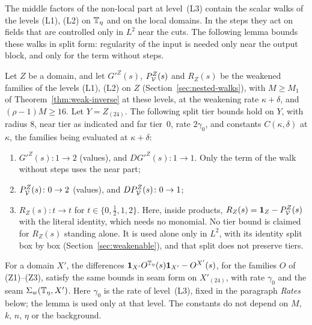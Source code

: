 The middle factors of the non-local part at level~(L3) contain the scalar walks of the levels (L1), (L2) on $\mathbb T_\eta$ and on the local domains. In the steps they act on fields that are controlled only in $L^2$ near the cuts. The following lemma bounds these walks in split form: regularity of the input is needed only near the output block, and only for the term without steps.

\begin{lemma}\label{lem:lift}
Let $Z$ be a domain, and let $G'^Z(s)$, $P^Z_\mathcal V(s)$ and $R_Z(s)$ be the weakened families of the levels (L1), (L2) on $Z$ (Section~\ref{sec:nested-walks}), with $M\ge M_1$ of Theorem~\ref{thm:weak-inverse} at these levels, at the weakening rate $\kappa+\delta$, and $(\rho-1)M\ge16$. Let $Y=Z_{(24)}$. The following split tier bounds hold on $Y$, with radius $8$, near tier as indicated and far tier~$0$, rate $2\gamma_0$, and constants $C(\kappa,\delta)$ at $\kappa$, the families being evaluated at $\kappa+\delta$:
\begin{enumerate}[label=(Z\arabic*)]
\item $G'^Z(s)\colon1\to2$ (values), and $DG'^Z(s)\colon1\to1$. Only the term of the walk without steps uses the near part;
\item $P^Z_\mathcal V(s)\colon0\to2$ (values), and $DP^Z_\mathcal V(s)\colon0\to1$;
\item $R_Z(s)\colon t\to t$ for $t\in\{0,\frac12,1,2\}$. Here, inside products, $R_Z(s)=\mathbf 1_Z-P^Z_\mathcal V(s)$ with the literal identity, which needs no monomial. No tier bound is claimed for $R_Z(s)$ standing alone. It is used alone only in $L^2$, with its identity split box by box (Section~\ref{sec:weakenable}), and that split does not preserve tiers.
\end{enumerate}
For a domain $X'$, the differences $\mathbf 1_{X'}O^{\mathbb T_\eta}(s)\mathbf 1_{X'}-O^{X'}(s)$, for the families $O$ of (Z1)--(Z3), satisfy the same bounds in seam form on $X'_{(24)}$, with rate $\gamma_0$ and the seam $\Sigma_w(\mathbb T_\eta,X')$. Here $\gamma_0$ is the rate of level~(L3), fixed in the paragraph \emph{Rates} below; the lemma is used only at that level. The constants do not depend on $M$, $k$, $n$, $\eta$ or the background.
\end{lemma}

